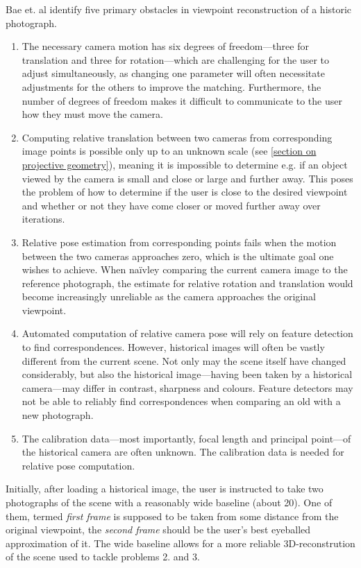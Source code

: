 Bae et. al identify five primary obstacles in viewpoint reconstruction of a
historic photograph.
\begin{enumerate}
   \item The necessary camera motion has six degrees of freedom---three for
      translation and three for rotation---which are challenging for the user
      to adjust simultaneously, as changing one parameter will often necessitate
      adjustments for the others to improve the matching. Furthermore, the
      number of degrees of freedom makes it difficult to communicate to the
      user how they must move the camera.
   \item Computing relative translation between two cameras from corresponding
      image points is possible only up to an unknown scale (see
      \autoref{section on projective geometry}), meaning it is impossible to
      determine e.g. if an object viewed by the camera is small and close or
      large and further away. This poses the problem of how to determine if the
      user is close to the desired viewpoint and whether or not they have come
      closer or moved further away over iterations. 
   \item Relative pose estimation from corresponding points fails when the
      motion between the two cameras approaches zero, which is the ultimate goal
      one wishes to achieve. When na\"ivley comparing the current camera image
      to the reference photograph, the estimate for relative rotation and
      translation would become increasingly unreliable as the camera approaches the
      original viewpoint.
   \item Automated computation of relative camera pose will rely on feature
      detection to find correspondences. However, historical images will often
      be vastly different from the current scene. Not only may the scene itself
      have changed considerably, but also the historical image---having been
      taken by a historical camera---may differ in contrast, sharpness and
      colours. Feature detectors may not be able to reliably find
      correspondences when comparing an old with a new photograph.
   \item The calibration data---most importantly, focal length and principal
      point---of the historical camera are often unknown. The calibration data
      is needed for relative pose computation.
\end{enumerate}

Initially, after loading a historical image, the user is instructed to
take two photographs of the scene with a reasonably wide baseline (about
20\textdegree). One of them, termed \emph{first frame} is supposed to be
taken from some distance from the original viewpoint, the \emph{second
frame} should be the user's best eyeballed approximation of it. The wide
baseline allows for a more reliable 3D-reconstrution of the scene used to
tackle problems 2. and 3. 

